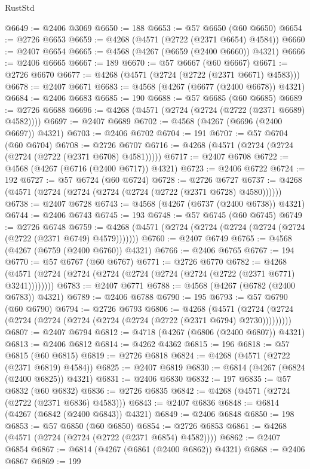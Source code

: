 \begin{lexlean}{RustStd}
\begin{coremodule}
@6649 := @2406 @3069
@6650 := 188
@6653 := @57 @6650 (@60 @6650)
@6654 := @2726 @6653
@6659 := @4268 (@4571 (@2722 (@2371 @6654) @4584))
@6660 := @2407 @6654
@6665 := @4568 (@4267 (@6659 (@2400 @6660)) @4321)
@6666 := @2406 @6665
@6667 := 189
@6670 := @57 @6667 (@60 @6667)
@6671 := @2726 @6670
@6677 := @4268 (@4571 (@2724 (@2722 (@2371 @6671) @4583)))
@6678 := @2407 @6671
@6683 := @4568 (@4267 (@6677 (@2400 @6678)) @4321)
@6684 := @2406 @6683
@6685 := 190
@6688 := @57 @6685 (@60 @6685)
@6689 := @2726 @6688
@6696 := @4268 (@4571 (@2724 (@2724 (@2722 (@2371 @6689) @4582))))
@6697 := @2407 @6689
@6702 := @4568 (@4267 (@6696 (@2400 @6697)) @4321)
@6703 := @2406 @6702
@6704 := 191
@6707 := @57 @6704 (@60 @6704)
@6708 := @2726 @6707
@6716 := @4268 (@4571 (@2724 (@2724 (@2724 (@2722 (@2371 @6708) @4581)))))
@6717 := @2407 @6708
@6722 := @4568 (@4267 (@6716 (@2400 @6717)) @4321)
@6723 := @2406 @6722
@6724 := 192
@6727 := @57 @6724 (@60 @6724)
@6728 := @2726 @6727
@6737 := @4268 (@4571 (@2724 (@2724 (@2724 (@2724 (@2722 (@2371 @6728) @4580))))))
@6738 := @2407 @6728
@6743 := @4568 (@4267 (@6737 (@2400 @6738)) @4321)
@6744 := @2406 @6743
@6745 := 193
@6748 := @57 @6745 (@60 @6745)
@6749 := @2726 @6748
@6759 := @4268 (@4571 (@2724 (@2724 (@2724 (@2724 (@2724 (@2722 (@2371 @6749) @4579)))))))
@6760 := @2407 @6749
@6765 := @4568 (@4267 (@6759 (@2400 @6760)) @4321)
@6766 := @2406 @6765
@6767 := 194
@6770 := @57 @6767 (@60 @6767)
@6771 := @2726 @6770
@6782 := @4268 (@4571 (@2724 (@2724 (@2724 (@2724 (@2724 (@2724 (@2722 (@2371 @6771) @3241))))))))
@6783 := @2407 @6771
@6788 := @4568 (@4267 (@6782 (@2400 @6783)) @4321)
@6789 := @2406 @6788
@6790 := 195
@6793 := @57 @6790 (@60 @6790)
@6794 := @2726 @6793
@6806 := @4268
    (@4571 (@2724 (@2724 (@2724 (@2724 (@2724 (@2724 (@2724 (@2722 (@2371 @6794) @2730)))))))))
@6807 := @2407 @6794
@6812 := @4718 (@4267 (@6806 (@2400 @6807)) @4321)
@6813 := @2406 @6812
@6814 := @4262 @4362
@6815 := 196
@6818 := @57 @6815 (@60 @6815)
@6819 := @2726 @6818
@6824 := @4268 (@4571 (@2722 (@2371 @6819) @4584))
@6825 := @2407 @6819
@6830 := @6814 (@4267 (@6824 (@2400 @6825)) @4321)
@6831 := @2406 @6830
@6832 := 197
@6835 := @57 @6832 (@60 @6832)
@6836 := @2726 @6835
@6842 := @4268 (@4571 (@2724 (@2722 (@2371 @6836) @4583)))
@6843 := @2407 @6836
@6848 := @6814 (@4267 (@6842 (@2400 @6843)) @4321)
@6849 := @2406 @6848
@6850 := 198
@6853 := @57 @6850 (@60 @6850)
@6854 := @2726 @6853
@6861 := @4268 (@4571 (@2724 (@2724 (@2722 (@2371 @6854) @4582))))
@6862 := @2407 @6854
@6867 := @6814 (@4267 (@6861 (@2400 @6862)) @4321)
@6868 := @2406 @6867
@6869 := 199

\end{coremodule}
\end{lexlean}
